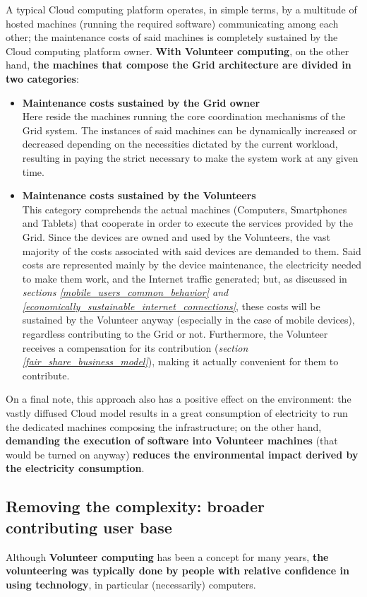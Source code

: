 A typical Cloud computing platform operates, in simple terms, by a multitude of hosted machines (running the required software) communicating among each other; the maintenance costs of said machines is completely sustained by the Cloud computing platform owner. \textbf{With Volunteer computing}, on the other hand, \textbf{the machines that compose the Grid architecture are divided in two categories}:
\begin{itemize}
    \item \textbf{Maintenance costs sustained by the Grid owner}\\
    Here reside the machines running the core coordination mechanisms of the Grid system. The instances of said machines can be dynamically increased or decreased depending on the necessities dictated by the current workload, resulting in paying the strict necessary to make the system work at any given time.
    \item \textbf{Maintenance costs sustained by the Volunteers}\\
    This category comprehends the actual machines (Computers, Smartphones and Tablets) that cooperate in order to execute the services provided by the Grid. Since the devices are owned and used by the Volunteers, the vast majority of the costs associated with said devices are demanded to them. Said costs are represented mainly by the device maintenance, the electricity needed to make them work, and the Internet traffic generated; but, as discussed in \textit{sections \ref{mobile_users_common_behavior} and \ref{economically_sustainable_internet_connections}}, these costs will be sustained by the Volunteer anyway (especially in the case of mobile devices), regardless contributing to the Grid or not. Furthermore, the Volunteer receives a compensation for its contribution (\textit{section \ref{fair_share_business_model}}), making it actually convenient for them to contribute.
\end{itemize}

On a final note, this approach also has a positive effect on the environment: the vastly diffused Cloud model results in a great consumption of electricity to run the dedicated machines composing the infrastructure; on the other hand, \textbf{demanding the execution of software into Volunteer machines} (that would be turned on anyway) \textbf{reduces the environmental impact derived by the electricity consumption}.

\subsection{Removing the complexity: broader contributing user base}
Although \textbf{Volunteer computing} has been a concept for many years, \textbf{the volunteering was typically done by people with relative confidence in using technology}, in particular (necessarily) computers.

